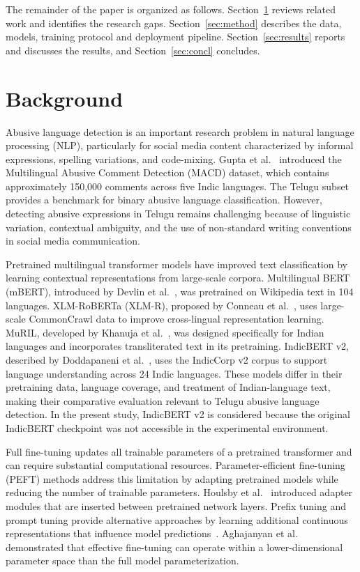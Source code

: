 \documentclass{svproc}
\begin{document}
The remainder of the paper is organized as follows. Section~\ref{sec:related} reviews related work and identifies the research gaps. Section~\ref{sec:method} describes the data, models, training protocol and deployment pipeline. Section~\ref{sec:results} reports and discusses the results, and Section~\ref{sec:concl} concludes.

\section{Background}
\label{sec:related}
Abusive language detection is an important research problem in natural language processing (NLP), particularly for social media content characterized by informal expressions, spelling variations, and code-mixing. Gupta et al.~\cite{gupta2022macd} introduced the Multilingual Abusive Comment Detection (MACD) dataset, which contains approximately 150,000 comments across five Indic languages. The Telugu subset provides a benchmark for binary abusive language classification. However, detecting abusive expressions in Telugu remains challenging because of linguistic variation, contextual ambiguity, and the use of non-standard writing conventions in social media communication.

Pretrained multilingual transformer models have improved text classification by learning contextual representations from large-scale corpora. Multilingual BERT (mBERT), introduced by Devlin et al.~\cite{devlin2019bert}, was pretrained on Wikipedia text in 104 languages. XLM-RoBERTa (XLM-R), proposed by Conneau et al.~\cite{conneau2020xlmr}, uses large-scale CommonCrawl data to improve cross-lingual representation learning. MuRIL, developed by Khanuja et al.~\cite{khanuja2021muril}, was designed specifically for Indian languages and incorporates transliterated text in its pretraining. IndicBERT v2, described by Doddapaneni et al.~\cite{doddapaneni2023indicbert}, uses the IndicCorp v2 corpus to support language understanding across 24 Indic languages. These models differ in their pretraining data, language coverage, and treatment of Indian-language text, making their comparative evaluation relevant to Telugu abusive language detection. In the present study, IndicBERT v2 is considered because the original IndicBERT checkpoint was not accessible in the experimental environment.

Full fine-tuning updates all trainable parameters of a pretrained transformer and can require substantial computational resources. Parameter-efficient fine-tuning (PEFT) methods address this limitation by adapting pretrained models while reducing the number of trainable parameters. Houlsby et al.~\cite{houlsby2019} introduced adapter modules that are inserted between pretrained network layers. Prefix tuning and prompt tuning provide alternative approaches by learning additional continuous representations that influence model predictions~\cite{li2021prefix,lester2021prompt}. Aghajanyan et al.~\cite{aghajanyan2021intrinsic} demonstrated that effective fine-tuning can operate within a lower-dimensional parameter space than the full model parameterization.
\end{document}
